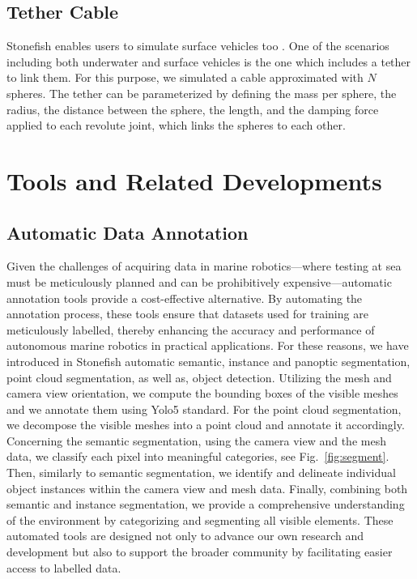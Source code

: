 \subsection{Tether Cable}
Stonefish enables users to simulate surface vehicles too \cite{grimaldi2024integratingdigitaltwinconcept}. One of the scenarios including both underwater and surface vehicles is the one which includes a tether to link them. For this purpose, we simulated a cable approximated with $N$ spheres. The tether can be parameterized by defining the mass per sphere, the radius, the distance between the sphere, the length, and the damping force applied to each revolute joint, which links the spheres to each other. 
\vspace{-0.1cm}
\section{Tools and Related Developments}
\subsection{Automatic Data Annotation}
Given the challenges of acquiring data in marine robotics—where testing at sea must be meticulously planned and can be prohibitively expensive—automatic annotation tools provide a cost-effective alternative. By automating the annotation process, these tools ensure that datasets used for training are meticulously labelled, thereby enhancing the accuracy and performance of autonomous marine robotics in practical applications.
For these reasons, we have introduced in Stonefish automatic semantic, instance and panoptic segmentation, point cloud segmentation, as well as, object detection.
Utilizing the mesh and camera view orientation, we compute the bounding boxes of the visible meshes and we annotate them using Yolo5 standard. For the point cloud segmentation, we decompose the visible meshes into a point cloud and annotate it accordingly. Concerning the semantic segmentation, using the camera view and the mesh data, we classify each pixel into meaningful categories, see Fig.~\ref{fig:segment}. Then, similarly to semantic segmentation, we identify and delineate individual object instances within the camera view and mesh data. Finally, combining both semantic and instance segmentation, we provide a comprehensive understanding of the environment by categorizing and segmenting all visible elements. 
These automated tools are designed not only to advance our own research and development but also to support the broader community by facilitating easier access to labelled data.

